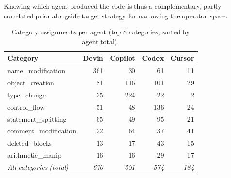 \documentclass[runningheads]{llncs}
\begin{document}
Knowing which agent produced the code is thus a complementary, partly
correlated prior alongside target strategy for narrowing the operator space.

\begin{table}[t]
\caption{Category assignments per agent (top 8 categories; sorted by agent total).}
\label{tab:agents}
\centering\footnotesize
\begin{tabular}{lrrrr}
\toprule
\textbf{Category} & \textbf{Devin} & \textbf{Copilot} & \textbf{Codex} & \textbf{Cursor} \\
\midrule
name\_modification    & 361 &  30 &  61 & 11 \\
object\_creation      &  81 & 116 & 101 & 29 \\
type\_change          &  35 & 224 &  22 &  2 \\
control\_flow         &  51 &  48 & 136 & 24 \\
statement\_splitting  &  65 &  49 &  95 & 21 \\
comment\_modification &  22 &  64 &  37 & 41 \\
deleted\_blocks       &  13 &  17 &  43 & 15 \\
arithmetic\_manip     &  16 &  16 &  29 & 17 \\
\midrule
\textit{All categories (total)} & \textit{670} & \textit{591} & \textit{574} & \textit{184} \\
\bottomrule
\end{tabular}
\end{table}
\end{document}
